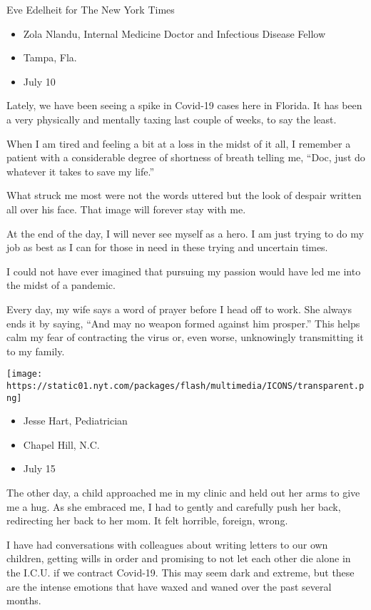 Eve Edelheit for The New York Times

\begin{itemize}
\tightlist
\item
  Zola Nlandu, Internal Medicine Doctor and Infectious Disease Fellow
\item
  Tampa, Fla.
\item
  July 10
\end{itemize}

Lately, we have been seeing a spike in Covid-19 cases here in Florida.
It has been a very physically and mentally taxing last couple of weeks,
to say the least.

When I am tired and feeling a bit at a loss in the midst of it all, I
remember a patient with a considerable degree of shortness of breath
telling me, ``Doc, just do whatever it takes to save my life.''

What struck me most were not the words uttered but the look of despair
written all over his face. That image will forever stay with me.

At the end of the day, I will never see myself as a hero. I am just
trying to do my job as best as I can for those in need in these trying
and uncertain times.

I could not have ever imagined that pursuing my passion would have led
me into the midst of a pandemic.

Every day, my wife says a word of prayer before I head off to work. She
always ends it by saying, ``And may no weapon formed against him
prosper.'' This helps calm my fear of contracting the virus or, even
worse, unknowingly transmitting it to my family.

\texttt{[image: https://static01.nyt.com/packages/flash/multimedia/ICONS/transparent.png]}

\begin{itemize}
\tightlist
\item
  Jesse Hart, Pediatrician
\item
  Chapel Hill, N.C.
\item
  July 15
\end{itemize}

The other day, a child approached me in my clinic and held out her arms
to give me a hug. As she embraced me, I had to gently and carefully push
her back, redirecting her back to her mom. It felt horrible, foreign,
wrong.

I have had conversations with colleagues about writing letters to our
own children, getting wills in order and promising to not let each other
die alone in the I.C.U. if we contract Covid-19. This may seem dark and
extreme, but these are the intense emotions that have waxed and waned
over the past several months.

